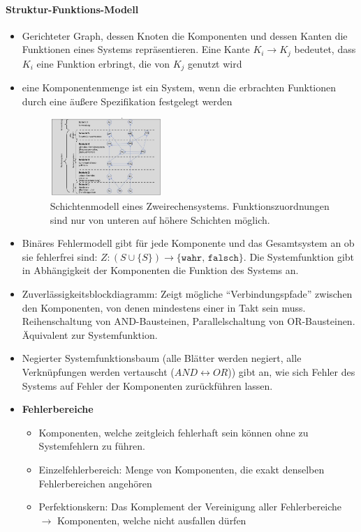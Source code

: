 	\paragraph{Struktur-Funktions-Modell}
		\begin{itemize}
			\item Gerichteter Graph, dessen Knoten die Komponenten und dessen Kanten die Funktionen eines Systems repräsentieren. Eine Kante \(K_i \longrightarrow K_j\) bedeutet, dass \(K_i\) eine Funktion erbringt, die von \(K_j\) genutzt wird
			\item eine Komponentenmenge ist ein System, wenn die erbrachten Funktionen durch eine äußere Spezifikation festgelegt werden		
			\begin{figure}
				\begin{center}
					\includegraphics[width=0.4\textwidth]{assets/schichtenmodell.jpg}
					\caption{Schichtenmodell eines Zweirechensystems. Funktionszuordnungen sind nur von unteren auf höhere Schichten möglich.}		
				\end{center}
				\end{figure}	
			\item Binäres Fehlermodell gibt für jede Komponente und das Gesamtsystem an ob sie fehlerfrei sind: $Z: (S \cup \{S\}) \rightarrow \{\texttt{wahr, falsch}\}$. Die Systemfunktion gibt in Abhängigkeit der Komponenten die Funktion des Systems an.
			\item Zuverlässigkeitsblockdiagramm: Zeigt mögliche "`Verbindungspfade"' zwischen den Komponenten, von denen mindestens einer in Takt sein muss. Reihenschaltung von AND-Bausteinen, Parallelschaltung von OR-Bausteinen. Äquivalent zur Systemfunktion.
			\item Negierter Systemfunktionsbaum (alle Blätter werden negiert, alle Verknüpfungen werden vertauscht (\(AND \leftrightarrow OR\))) gibt an, wie sich Fehler des Systems auf Fehler der Komponenten zurückführen lassen.
			\item \textbf{Fehlerbereiche} 
			\begin{itemize}
				\item Komponenten, welche zeitgleich fehlerhaft sein können ohne zu Systemfehlern zu führen. 
				\item Einzelfehlerbereich: Menge von Komponenten, die exakt denselben Fehlerbereichen angehören
				\item Perfektionskern: Das Komplement der Vereinigung aller Fehlerbereiche $\rightarrow$ Komponenten, welche nicht ausfallen dürfen
			\end{itemize}
		\end{itemize}


